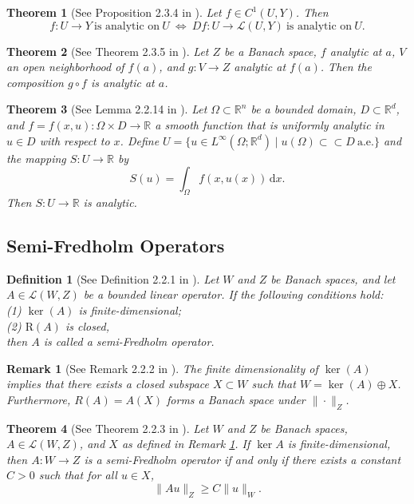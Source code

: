 \documentclass{article}
\numberwithin{equation}{section}
\newtheorem{theorem}{Theorem}[section]
\newtheorem{definition}{Definition}[section]
\newtheorem{remark}{Remark}[section]
\begin{document}
\begin{theorem}[See Proposition 2.3.4 in \cite{ref13}]
    Let $f\in C^1(U,Y)$. Then
    $$f:U\to Y\ \text{is analytic on}\ U\ \Longleftrightarrow\ Df:U\to \mathcal{L}(U,Y)\ \text{is analytic on}\ U.$$
\end{theorem}

\begin{theorem}[See Theorem 2.3.5 in \cite{ref13}]\label{lemma2.2}
    Let $Z$ be a Banach space, $f$ analytic at $a$, $V$ an open neighborhood of $f(a)$, and $g:V\to Z$ analytic at $f(a)$. Then the composition $g\circ f$ is analytic at $a$.
\end{theorem}

\begin{theorem}[See Lemma 2.2.14 in \cite{ref21}]\label{lemma2.3}
    Let $\Omega\subset \mathbb{R}^n$ be a bounded domain, $D\subset \mathbb{R}^d$, and $f=f(x,u):\Omega\times D\to\mathbb{R}$ a smooth function that is uniformly analytic in $u\in D$ with respect to $x$. Define $U=\{u\in L^{\infty}(\Omega;\mathbb{R}^d)\mid u(\Omega)\subset\subset D\ \mathrm{a.e.}\}$ and the mapping $S:U\to \mathbb{R}$ by
    $$S(u)=\int_{\Omega}f(x,u(x))\,\mathrm{d}x.$$
    Then $S:U\to \mathbb{R}$ is analytic.
\end{theorem}

\subsection{Semi-Fredholm Operators}

\begin{definition}[See Definition 2.2.1 in \cite{ref13}]
    Let $W$ and $Z$ be Banach spaces, and let $A \in \mathcal{L}(W, Z)$ be a bounded linear operator. If the following conditions hold:
    \\(1) $\ker(A)$ is finite-dimensional; \\
    (2) $\mathrm{R}(A)$ is closed, \\
    then $A$ is called a semi-Fredholm operator.
\end{definition}

\begin{remark}[See Remark 2.2.2 in \cite{ref13}]\label{ker}
    The finite dimensionality of $\ker(A)$ implies that there exists a closed subspace $X \subset W$ such that $W = \ker(A) \oplus X$. Furthermore, $R(A) = A(X)$ forms a Banach space under $\|\cdot\|_{Z}$.
\end{remark}

\begin{theorem}[See Theorem 2.2.3 in \cite{ref13}]
    Let $W$ and $Z$ be Banach spaces, $A \in \mathcal{L}(W, Z)$, and $X$ as defined in Remark \ref{ker}. If $\ker A$ is finite-dimensional, then $A: W \to Z$ is a semi-Fredholm operator if and only if there exists a constant $C > 0$ such that for all $u \in X$,
    $$\|Au\|_{Z} \geq C\|u\|_{W}.$$
\end{theorem}
\end{document}
